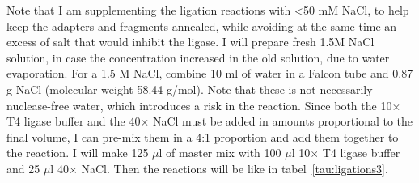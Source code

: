 \documentclass[a4paper,12pt,twosided]{article}
\begin{document}
Note that I am supplementing the ligation reactions with <50 mM NaCl, to help keep the adapters and fragments annealed, while avoiding at the same time an excess of salt that would inhibit the ligase. I will prepare fresh 1.5M NaCl solution, in case the concentration increased in the old solution, due to water evaporation. For a 1.5 M NaCl, combine 10 ml of water in a Falcon tube and 0.87 g NaCl (molecular weight 58.44 g/mol). Note that these is not necessarily nuclease-free water, which introduces a risk in the reaction. Since both the 10$\times$ T4 ligase buffer and the 40$\times$ NaCl must be added in amounts proportional to the final volume, I can pre-mix them in a 4:1 proportion and add them together to the reaction. I will make 125 $\mu$l of master mix with 100 $\mu$l 10$\times$ T4 ligase buffer and 25 $\mu$l 40$\times$ NaCl. Then the reactions will be like in tabel~\ref{tau:ligations3}.
\end{document}
